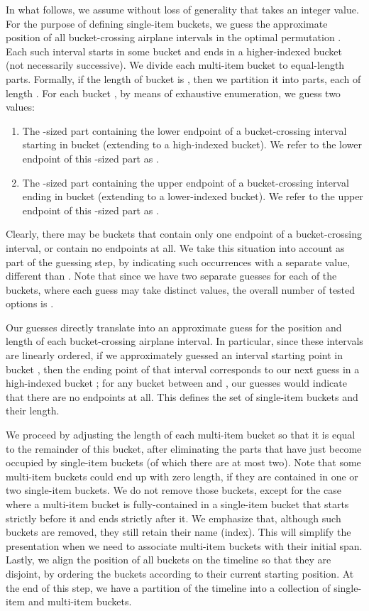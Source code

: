 \documentclass[11pt]{article}
\theoremstyle{plain}
\theoremstyle{definition}
\begin{document}
\smallskip {} In what follows, we assume without loss of generality that  takes an integer value. For the purpose of defining single-item buckets, we guess the approximate position of all bucket-crossing airplane intervals in the optimal permutation . Each such interval starts in some bucket and ends in a higher-indexed bucket (not necessarily successive). We divide each multi-item bucket  to  equal-length parts. Formally, if the length of bucket  is , then we partition it into  parts, each of length . For each bucket , by means of exhaustive enumeration, we guess two values:
\begin{enumerate}
\item The -sized part containing the lower endpoint of a bucket-crossing interval starting in bucket  (extending to a high-indexed bucket). We refer to the lower endpoint of this -sized part as .

\item The -sized part containing the upper endpoint of a bucket-crossing interval ending in bucket  (extending to a lower-indexed bucket). We refer to the upper endpoint of this -sized part as .
\end{enumerate}
Clearly, there may be buckets that contain only one endpoint of a bucket-crossing interval, or contain no endpoints at all. We take this situation into account as part of the guessing step, by indicating such occurrences with a separate value, different than . Note that since we have two separate guesses for each of the  buckets, where each guess may take  distinct values, the overall number of tested options is .

\smallskip {} Our guesses directly translate into an approximate guess for the position and length of each bucket-crossing airplane interval. In particular, since these intervals are linearly ordered, if we approximately guessed an interval starting point  in bucket , then the ending point of that interval corresponds to our next  guess in a high-indexed bucket ; for any bucket between  and , our guesses would indicate that there are no endpoints at all. This defines the set of single-item buckets and their length.

We proceed by adjusting the length of each multi-item bucket so that it is equal to the remainder of this bucket, after eliminating the parts that have just become occupied by single-item buckets (of which there are at most two). Note that some multi-item buckets could end up with zero length, if they are contained in one or two single-item buckets. We do not remove those buckets, except for the case where a multi-item bucket is fully-contained in a single-item bucket that starts strictly before it and ends strictly after it. We emphasize that, although such buckets are removed, they still retain their name (index). This will simplify the presentation when we need to associate multi-item buckets with their initial span.
Lastly, we align the position of all buckets on the timeline so that they are disjoint, by ordering the buckets according to their current starting position. At the end of this step, we have a partition of the timeline into a collection of  single-item and multi-item buckets.
\end{document}
